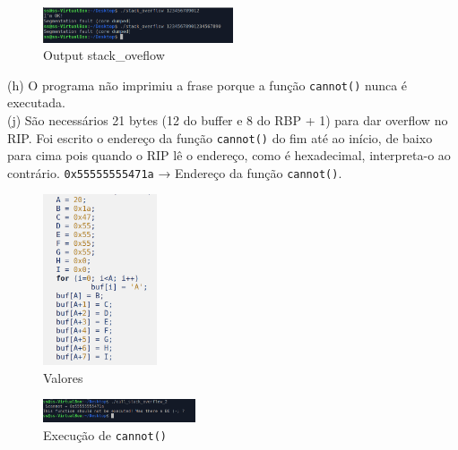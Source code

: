\documentclass[11pt]{report}
\begin{document}
\vspace{20pt}
\begin{figure}[h]
    \centering
    \includegraphics[width=0.5\textwidth]{rip.png}
    \caption{Output stack\_oveflow}
  \end{figure}

\vspace{20pt}

(h) O programa não imprimiu a frase porque a função \texttt{cannot()} nunca é executada.
\\


(j) São necessários 21 bytes (12 do buffer e 8 do RBP + 1) para dar overflow no RIP.
Foi escrito o endereço da função \texttt{cannot()} do fim até ao início, de baixo para cima pois quando o RIP lê o endereço, como é hexadecimal, interpreta-o ao contrário.
\texttt{0x55555555471a} → Endereço da função \texttt{cannot()}.

\vspace{20pt}

\begin{figure}[h]
    \centering
    \includegraphics[width=0.3\textwidth]{valores.png}
    \caption{Valores}
  \end{figure}

\begin{figure}[h]
    \centering
    \includegraphics[width=0.4\textwidth]{BO_CALL.png}
    \caption{Execução de \texttt{cannot()}}
  \end{figure}

\vspace{20pt}
\end{document}
